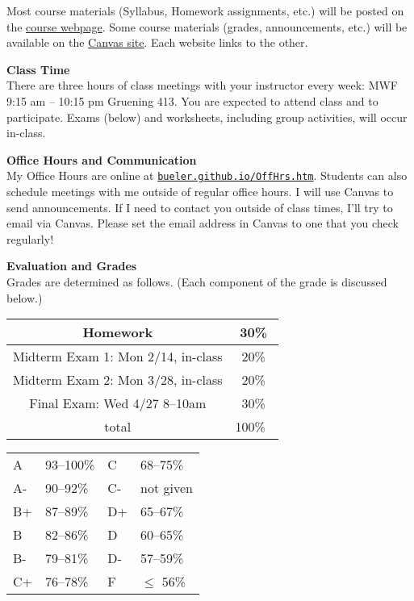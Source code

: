 \documentclass[12pt]{article}
\renewcommand{\emph}[1]{\textsf{\textbf{#1}}}
\newcommand{\localhead}[1]{\par\smallskip\textbf{#1} \smallskip\nobreak\\}%
\def\heading#1{\localhead{\large\emph{#1}}}
\begin{document}
Most course materials (Syllabus, Homework assignments, etc.) will be posted on the \href{https://bueler.github.io/math314/}{course webpage}.  Some course materials (grades, announcements, etc.) will be available on the \href{https://canvas.alaska.edu/courses/7017}{Canvas site}.  Each website links to the other.


\heading{Class Time}
There are three hours of class meetings with your instructor every week: MWF 9:15 am -- 10:15 pm  Gruening 413.  You are expected to attend class and to participate.  Exams (below) and worksheets, including group activities, will occur in-class.


\clearpage\newpage
\phantom{foo}

\heading{Office Hours and Communication}
My Office Hours are online at \href{http://bueler.github.io/OffHrs.htm}{\texttt{bueler.github.io/OffHrs.htm}}.  Students can also schedule meetings with me outside of regular office hours.  I will use Canvas to send announcements.  If I need to contact you outside of class times, I'll try to email via Canvas.  Please set the email address in Canvas to one that you check regularly!


\heading{Evaluation and Grades}
Grades are determined as follows.  (Each component of the grade is discussed below.)
 
\begin{multicols}{2}
\begin{tabular}{|c|c|}
\hline
Homework & 30\% \\
\hline
Midterm Exam 1: Mon 2/14, in-class & 20\% \\
\hline
Midterm Exam 2: Mon 3/28, in-class & 20\%  \\
\hline
Final Exam: Wed 4/27 8--10am & 30\% \\
\hline
total & 100\% \, \\
\hline
\end{tabular}

\begin{tabular}{llll}
A  & 93--100\%& C  & 68--75\%  \\
A- & 90--92\% & C- & not given \\
B+ & 87--89\% & D+ & 65--67\%  \\
B  & 82--86\% & D  & 60--65\%  \\
B- & 79--81\% & D- & 57--59\%  \\
C+ & 76--78\% & F  & $\le$ 56\%
\end{tabular}
\end{multicols}
\end{document}
